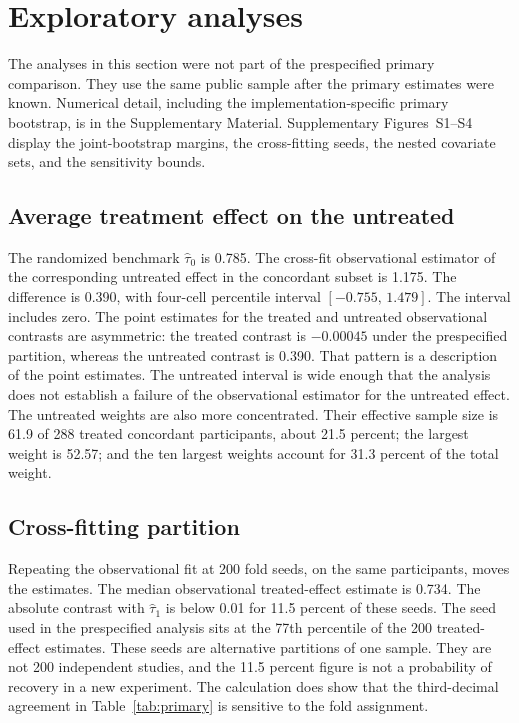 \documentclass[11pt]{article}
\theoremstyle{remark}
\begin{document}
\section{Exploratory analyses}
\label{sec:exploratory}

The analyses in this section were not part of the prespecified primary comparison. They use the same public sample after the primary estimates were known. Numerical detail, including the implementation-specific primary bootstrap, is in the Supplementary Material. Supplementary Figures~S1--S4 display the joint-bootstrap margins, the cross-fitting seeds, the nested covariate sets, and the sensitivity bounds.

\subsection{Average treatment effect on the untreated}

The randomized benchmark $\widehat\tau_0$ is 0.785. The cross-fit observational estimator of the corresponding untreated effect in the concordant subset is 1.175. The difference is 0.390, with four-cell percentile interval $[-0.755,\,1.479]$. The interval includes zero. The point estimates for the treated and untreated observational contrasts are asymmetric: the treated contrast is $-0.00045$ under the prespecified partition, whereas the untreated contrast is 0.390. That pattern is a description of the point estimates. The untreated interval is wide enough that the analysis does not establish a failure of the observational estimator for the untreated effect. The untreated weights are also more concentrated. Their effective sample size is 61.9 of 288 treated concordant participants, about 21.5 percent; the largest weight is 52.57; and the ten largest weights account for 31.3 percent of the total weight.

\subsection{Cross-fitting partition}

Repeating the observational fit at 200 fold seeds, on the same participants, moves the estimates. The median observational treated-effect estimate is 0.734. The absolute contrast with $\widehat\tau_1$ is below 0.01 for 11.5 percent of these seeds. The seed used in the prespecified analysis sits at the 77th percentile of the 200 treated-effect estimates. These seeds are alternative partitions of one sample. They are not 200 independent studies, and the 11.5 percent figure is not a probability of recovery in a new experiment. The calculation does show that the third-decimal agreement in Table~\ref{tab:primary} is sensitive to the fold assignment.
\end{document}
